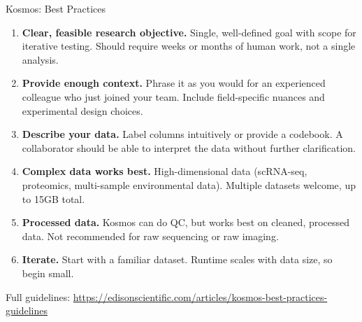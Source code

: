 \documentclass[aspectratio=169]{beamer}
\begin{document}
\begin{frame}{Kosmos: Best Practices}
    \begin{enumerate}
        \item \textbf{Clear, feasible research objective.} Single, well-defined goal with scope for iterative testing. Should require weeks or months of human work, not a single analysis.
        \item \textbf{Provide enough context.} Phrase it as you would for an experienced colleague who just joined your team. Include field-specific nuances and experimental design choices.
        \item \textbf{Describe your data.} Label columns intuitively or provide a codebook. A collaborator should be able to interpret the data without further clarification.
        \item \textbf{Complex data works best.} High-dimensional data (scRNA-seq, proteomics, multi-sample environmental data). Multiple datasets welcome, up to 15GB total.
        \item \textbf{Processed data.} Kosmos can do QC, but works best on cleaned, processed data. Not recommended for raw sequencing or raw imaging.
        \item \textbf{Iterate.} Start with a familiar dataset. Runtime scales with data size, so begin small.
    \end{enumerate}

    \vspace{0.3em}
    {\footnotesize Full guidelines: \url{https://edisonscientific.com/articles/kosmos-best-practices-guidelines}}
\end{frame}

\end{document}

